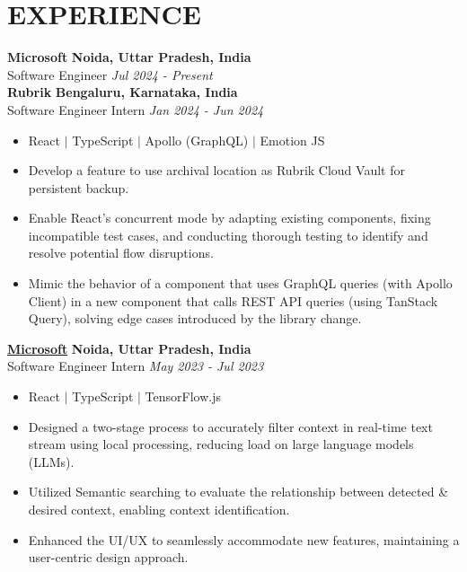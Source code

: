 \documentclass[12pt]{article}
\begin{document}
\section*{EXPERIENCE}
\textbf{Microsoft} \hfill \textbf{Noida, Uttar Pradesh, India} \\
Software Engineer  \hfill \textit{Jul 2024 - Present} \\
\textbf{Rubrik} \hfill \textbf{Bengaluru, Karnataka, India} \\
Software Engineer Intern  \hfill \textit{Jan 2024 - Jun 2024} \\
\begin{itemize}[topsep=1pt, itemsep=1.5pt, partopsep=1pt, parsep=1pt]
	\item React $|$ TypeScript $|$ Apollo (GraphQL) $|$ Emotion JS
	\item Develop a feature to use archival location as Rubrik Cloud Vault for persistent backup.
	\item Enable React's concurrent mode by adapting existing components, fixing incompatible test cases, and conducting thorough testing to identify and resolve potential flow disruptions.
	\item Mimic the behavior of a component that uses GraphQL queries (with Apollo Client) in a new component that calls REST API queries (using TanStack Query), solving edge cases introduced by the library change.
\end{itemize}



\textbf{\href{https://drive.google.com/file/d/1AmHyhbctI577QKw8zxRCBjzVVyGyQHvb/view}{Microsoft}} \hfill \textbf{Noida, Uttar Pradesh, India} \\
Software Engineer Intern  \hfill \textit{May 2023 - Jul 2023} \\
\begin{itemize}[topsep=1pt, itemsep=1.5pt, partopsep=1pt, parsep=1pt]
	\item React $|$ TypeScript $|$ TensorFlow.js
	\item Designed a two-stage process to accurately filter context in real-time text stream using local processing, reducing load on large language models (LLMs).
	\item Utilized Semantic searching to evaluate the relationship between detected \& desired context, enabling context identification.
	\item Enhanced the UI/UX to seamlessly accommodate new features, maintaining a user-centric design approach.
\end{itemize}
\end{document}
